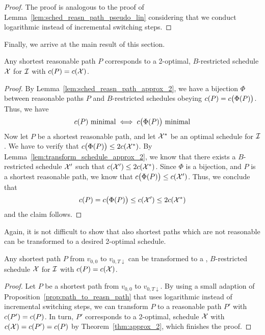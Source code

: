 \begin{proof}
The proof is analogous to the proof of Lemma~\ref{lem:sched_reasn_path_pseudo_lin} considering that we conduct logarithmic instead of incremental switching steps.
\end{proof}
Finally, we arrive at the main result of this section.
\begin{thm}\label{thm:approx_2}
Any shortest reasonable path $P$ corresponds to a 2-optimal, $B$-restricted schedule $\mathcal{X}$ for $\mathcal{I}$ with $c(P)=c(\mathcal{X})$.
\end{thm} 
\begin{proof}
By Lemma~\ref{lem:sched_reasn_path_approx_2}, we have a bijection $\Phi$ between reasonable paths $P$ and $B$-restricted schedules obeying $c(P)=c\bigl(\Phi(P)\bigr)$. Thus, we have 
\begin{equation*}
	c(P)\text{ minimal}\iff c\bigl(\Phi(P)\big)\text{ minimal}
\end{equation*}
Now let $P$ be a shortest reasonable path, and let $\mathcal{X}^*$ be an optimal schedule for $\mathcal{I}$. We have to verify that $c\bigl(\Phi(P)\bigr)\le 2c(\mathcal{X}^*)$. By Lemma~\ref{lem:transform_schedule_approx_2}, we know that there exists a $B$-restricted schedule $\mathcal{X}'$ such that $c(\mathcal{X}')\le 2c(\mathcal{X}^*)$. Since $\Phi$ is a bijection, and $P$ is a shortest reasonable path, we know that $c\bigl(\Phi(P)\bigr)\le c(\mathcal{X}')$. Thus, we conclude that 
\begin{equation*}
	c(P)=c\bigl(\Phi(P)\bigr)\le c(\mathcal{X}')\le 2c(\mathcal{X}^*)
\end{equation*}
and the claim follows.
\end{proof}
Again, it is not difficult to show that also shortest paths which are not reasonable can be transformed to a desired 2-optimal schedule.
\begin{cor}\label{cor:approx_2_sched_short_path}
Any shortest path $P$ from $v_{0,0}$ to $v_{0,T\downarrow}$ can be transformed to a , $B$-restricted schedule $\mathcal{X}$ for $\mathcal{I}$ with $c(P)=c(\mathcal{X})$.
\end{cor}
\begin{proof}
Let $P$ be a shortest path from $v_{0,0}$ to $v_{0,T\downarrow}$. By using a small adaption of Proposition~\ref{prop:path_to_reasn_path} that uses logarithmic instead of incremental switching steps, we can transform $P$ to a reasonable path $P'$ with $c(P')=c(P)$.
In turn, $P'$ corresponds to a 2-optimal,  schedule $\mathcal{X}$ with $c(\mathcal{X})=c(P')=c(P)$ by Theorem~\ref{thm:approx_2}, which finishes the proof.
\end{proof}

